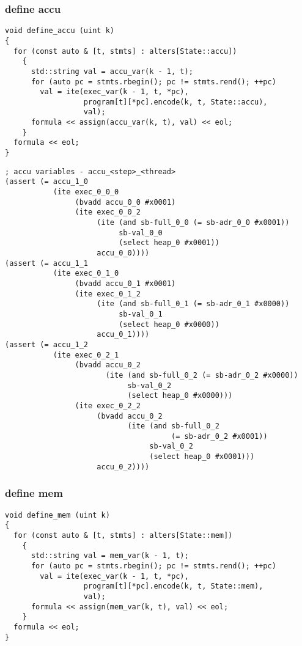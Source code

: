 \subsubsection{define accu}

\begin{lstlisting}[style=c++]
void define_accu (uint k)
{
  for (const auto & [t, stmts] : alters[State::accu])
    {
      std::string val = accu_var(k - 1, t);
      for (auto pc = stmts.rbegin(); pc != stmts.rend(); ++pc)
        val = ite(exec_var(k - 1, t, *pc),
                  program[t][*pc].encode(k, t, State::accu),
                  val);
      formula << assign(accu_var(k, t), val) << eol;
    }
  formula << eol;
}
\end{lstlisting}

\begin{lstlisting}[language=SMTLib]
; accu variables - accu_<step>_<thread>
(assert (= accu_1_0
           (ite exec_0_0_0
                (bvadd accu_0_0 #x0001)
                (ite exec_0_0_2
                     (ite (and sb-full_0_0 (= sb-adr_0_0 #x0001))
                          sb-val_0_0
                          (select heap_0 #x0001))
                     accu_0_0))))
(assert (= accu_1_1
           (ite exec_0_1_0
                (bvadd accu_0_1 #x0001)
                (ite exec_0_1_2
                     (ite (and sb-full_0_1 (= sb-adr_0_1 #x0000))
                          sb-val_0_1
                          (select heap_0 #x0000))
                     accu_0_1))))
(assert (= accu_1_2
           (ite exec_0_2_1
                (bvadd accu_0_2
                       (ite (and sb-full_0_2 (= sb-adr_0_2 #x0000))
                            sb-val_0_2
                            (select heap_0 #x0000)))
                (ite exec_0_2_2
                     (bvadd accu_0_2
                            (ite (and sb-full_0_2
                                      (= sb-adr_0_2 #x0001))
                                 sb-val_0_2
                                 (select heap_0 #x0001)))
                     accu_0_2))))
\end{lstlisting}

\subsubsection{define mem}

\begin{lstlisting}[style=c++]
void define_mem (uint k)
{
  for (const auto & [t, stmts] : alters[State::mem])
    {
      std::string val = mem_var(k - 1, t);
      for (auto pc = stmts.rbegin(); pc != stmts.rend(); ++pc)
        val = ite(exec_var(k - 1, t, *pc),
                  program[t][*pc].encode(k, t, State::mem),
                  val);
      formula << assign(mem_var(k, t), val) << eol;
    }
  formula << eol;
}
\end{lstlisting}

